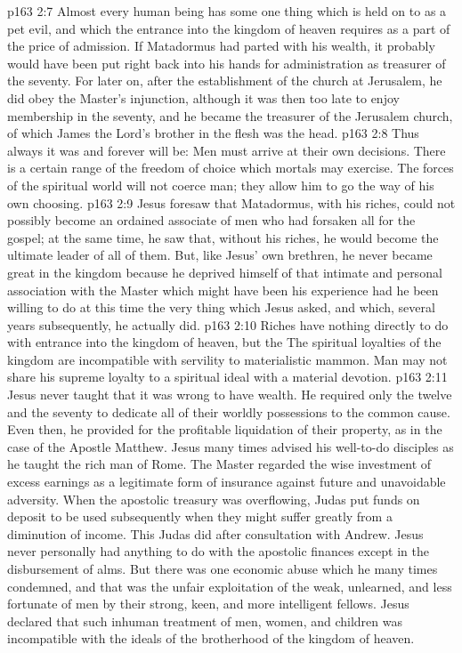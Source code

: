 \vs p163 2:7 \pc Almost every human being has some one thing which is held on to as a pet evil, and which the entrance into the kingdom of heaven requires as a part of the price of admission. If Matadormus had parted with his wealth, it probably would have been put right back into his hands for administration as treasurer of the seventy. For later on, after the establishment of the church at Jerusalem, he did obey the Master’s injunction, although it was then too late to enjoy membership in the seventy, and he became the treasurer of the Jerusalem church, of which James the Lord’s brother in the flesh was the head.
\vs p163 2:8 Thus always it was and forever will be: Men must arrive at their own decisions. There is a certain range of the freedom of choice which mortals may exercise. The forces of the spiritual world will not coerce man; they allow him to go the way of his own choosing.
\vs p163 2:9 Jesus foresaw that Matadormus, with his riches, could not possibly become an ordained associate of men who had forsaken all for the gospel; at the same time, he saw that, without his riches, he would become the ultimate leader of all of them. But, like Jesus’ own brethren, he never became great in the kingdom because he deprived himself of that intimate and personal association with the Master which might have been his experience had he been willing to do at this time the very thing which Jesus asked, and which, several years subsequently, he actually did.
\vs p163 2:10 Riches have nothing directly to do with entrance into the kingdom of heaven, but the  The spiritual loyalties of the kingdom are incompatible with servility to materialistic mammon. Man may not share his supreme loyalty to a spiritual ideal with a material devotion.
\vs p163 2:11 Jesus never taught that it was wrong to have wealth. He required only the twelve and the seventy to dedicate all of their worldly possessions to the common cause. Even then, he provided for the profitable liquidation of their property, as in the case of the Apostle Matthew. Jesus many times advised his well\hyp{}to\hyp{}do disciples as he taught the rich man of Rome. The Master regarded the wise investment of excess earnings as a legitimate form of insurance against future and unavoidable adversity. When the apostolic treasury was overflowing, Judas put funds on deposit to be used subsequently when they might suffer greatly from a diminution of income. This Judas did after consultation with Andrew. Jesus never personally had anything to do with the apostolic finances except in the disbursement of alms. But there was one economic abuse which he many times condemned, and that was the unfair exploitation of the weak, unlearned, and less fortunate of men by their strong, keen, and more intelligent fellows. Jesus declared that such inhuman treatment of men, women, and children was incompatible with the ideals of the brotherhood of the kingdom of heaven.
